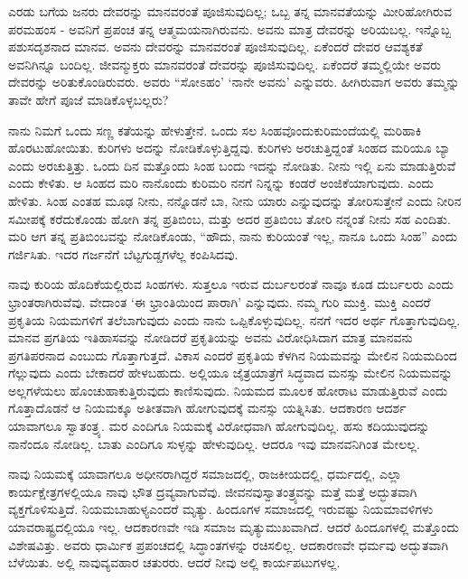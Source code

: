 ಎರಡು ಬಗೆಯ ಜನರು ದೇವರನ್ನು ಮಾನವರಂತೆ ಪೂಜಿಸುವುದಿಲ್ಲ; ಒಬ್ಬ ತನ್ನ ಮಾನವತೆಯನ್ನು ಮೀರಿಹೋಗಿರುವ ಪರಮಹಂಸ - ಅವನಿಗೆ ಪ್ರಪಂಚ ತನ್ನ ಆತ್ಮಮಯನಾಗಿರುವನು. ಅವನು ಮಾತ್ರ ದೇವರನ್ನು ಅರಿಯಬಲ್ಲ. ಇನ್ನೊಬ್ಬ ಪಶುಸದೃಶನಾದ ಮಾನವ. ಅವನು ದೇವರನ್ನು ಮಾನವರಂತೆ ಪೂಜಿಸುವುದಿಲ್ಲ. ಏಕೆಂದರೆ ದೇವರ ಆವಶ್ಯಕತೆ ಅವನಿಗಿನ್ನೂ ಬಂದಿಲ್ಲ. ಜೀವನ್ಮುಕ್ತರು ಮಾನವರಂತೆ ದೇವರನ್ನು ಪೂಜಿಸುವುದಿಲ್ಲ. ಏಕೆಂದರೆ ತಮ್ಮಲ್ಲಿಯೇ ಅವರು ದೇವರನ್ನು ಅರಿತುಕೊಂಡಿರುವರು. ಅವರು “ಸೋಽಹಂ’ ‘ನಾನೇ ಅವನು’ ಎನ್ನುವರು. ಹೀಗಿರುವಾಗ ಅವರು ತಮ್ಮನ್ನು ತಾವೇ ಹೇಗೆ ಪೂಜೆ ಮಾಡಿಕೊಳ್ಳಬಲ್ಲರು?

ನಾನು ನಿಮಗೆ ಒಂದು ಸಣ್ಣ ಕತೆಯನ್ನು ಹೇಳುತ್ತೇನೆ. ಒಂದು ಸಲ ಸಿಂಹವೊಂದು\break ಕುರಿಮಂದೆಯಲ್ಲಿ ಮರಿಹಾಕಿ ಹೊರಟುಹೋಯಿತು. ಕುರಿಗಳು ಅದನ್ನು ನೋಡಿಕೊಳ್ಳುತ್ತಿದ್ದವು. ಕುರಿಗಳು ಅರಚುತ್ತಿದ್ದಂತೆ ಸಿಂಹದ ಮರಿಯೂ ಬ್ಯಾ ಎಂದು ಅರಚುತ್ತಿತ್ತು. ಒಂದು ದಿನ ಮತ್ತೊಂದು ಸಿಂಹ ಬಂದು ಇದನ್ನು ನೋಡಿತು. ನೀನು ಇಲ್ಲಿ ಏನು ಮಾಡುತ್ತಿರುವೆ ಎಂದು ಕೇಳಿತು. ಆ ಸಿಂಹದ ಮರಿ ನಾನೊಂದು ಕುರಿಮರಿ ನನಗೆ ನಿನ್ನನ್ನು ಕಂಡರೆ ಅಂಜಿಕೆಯಾಗುವುದು. ಎಂದು ಹೇಳಿತು. ಸಿಂಹ ಎಂತಹ ಮೂಢ ನೀನು, ನನ್ನೊಡನೆ ಬಾ, ನೀನು ಯಾರು ಎನ್ನುವುದನ್ನು ತೋರಿಸುತ್ತೇನೆ ಎಂದು ನೀರಿನ ಸಮೀಪಕ್ಕೆ ಕರೆದುಕೊಂಡು ಹೋಗಿ ತನ್ನ ಪ್ರತಿಬಿಂಬ, ಮತ್ತು ಅದರ ಪ್ರತಿಬಿಂಬ ತೋರಿ ನನ್ನಂತೆ ನೀನು ಸಹ ಎಂದಿತು. ಮರಿ ಆಗ ತನ್ನ ಪ್ರತಿಬಿಂಬವನ್ನು ನೋಡಿಕೊಂಡು, “ಹೌದು, ನಾನು ಕುರಿಯಂತೆ ಇಲ್ಲ, ನಾನೂ ಒಂದು ಸಿಂಹ” ಎಂದು ಗರ್ಜಿಸಿತು. ಇದರ ಗರ್ಜನೆಗೆ ಬೆಟ್ಟಗುಡ್ಡಗಳೆಲ್ಲ ಕಂಪಿಸಿದವು.

ನಾವು ಕುರಿಯ ಹೊದಿಕೆಯಲ್ಲಿರುವ ಸಿಂಹಗಳು. ಸುತ್ತಲೂ ಇರುವ ದುರ್ಬಲರಂತೆ ನಾವೂ ಕೂಡ ದುರ್ಬಲರು ಎಂದು ಭ್ರಾಂತರಾಗಿರುವೆವು. ವೇದಾಂತ ‘ಈ ಭ್ರಾಂತಿಯಿಂದ ಪಾರಾಗಿ’ ಎನ್ನುವುದು. ನಮ್ಮ ಗುರಿ ಮುಕ್ತಿ. ಮುಕ್ತಿ ಎಂದರೆ ಪ್ರಕೃತಿಯ ನಿಯಮಗಳಿಗೆ ತಲೆಬಾಗುವುದು ಎಂದು ನಾನು ಒಪ್ಪಿಕೊಳ್ಳುವುದಿಲ್ಲ. ನನಗೆ ಇದರ ಅರ್ಥ ಗೊತ್ತಾಗುವುದಿಲ್ಲ. ಮಾನವ ಪ್ರಗತಿಯ ಇತಿಹಾಸವನ್ನು ನೋಡಿದರೆ ಪ್ರಕೃತಿಯನ್ನು ಅವನು ವಿರೋಧಿಸಿದಾಗ ಮಾತ್ರ ಮಾನವನು ಪ್ರಗತಿಪರನಾದ ಎಂಬುದು ಗೊತ್ತಾಗುತ್ತದೆ. ವಿಕಾಸ ಎಂದರೆ ಪ್ರಕೃತಿಯ ಕೆಳಗಿನ ನಿಯಮವನ್ನು ಮೇಲಿನ ನಿಯಮದಿಂದ ಗೆಲ್ಲುವುದು ಎಂದು ಬೇಕಾದರೆ ಹೇಳಬಹುದು. ಅಲ್ಲಿಯೂ ಜೈತ್ರಯಾತ್ರೆಗೆ ಸಿದ್ಧವಾದ ಮನಸ್ಸು ಮೇಲಿನ ನಿಯಮವನ್ನು ಅಲ್ಲಗಳೆಯಲು ಹೊಂಚುಹಾಕುತ್ತಿರುವುದು ಕಾಣಿಸುವುದು. ನಿಯಮದ ಮೂಲಕ ಹೋರಾಟ ಮಾಡುತ್ತಿರುವೆ ಎಂದು ಗೊತ್ತಾದೊಡನೆ ಆ ನಿಯಮಕ್ಕೂ ಅತೀತವಾಗಿ ಹೋಗುವುದಕ್ಕೆ ಮನಸ್ಸು ಯತ್ನಿಸಿತು. ಆದಕಾರಣ ಆದರ್ಶ ಯಾವಾಗಲೂ ಸ್ವಾತಂತ್ರ್ಯ. ಮರ ಎಂದಿಗೂ ನಿಯಮಕ್ಕೆ ವಿರೋಧವಾಗಿ ಹೋಗುವುದಿಲ್ಲ. ಹಸು ಕದಿಯುವುದನ್ನು ನಾನೆಂದೂ ನೋಡಿಲ್ಲ. ಬಾತು ಎಂದಿಗೂ ಸುಳ್ಳನ್ನು ಹೇಳುವುದಿಲ್ಲ. ಆದರೂ ಇವು ಮಾನವನಿಗಿಂತ ಮೇಲಲ್ಲ.

ನಾವು ನಿಯಮಕ್ಕೆ ಯಾವಾಗಲೂ ಅಧೀನರಾಗಿದ್ದರೆ ಸಮಾಜದಲ್ಲಿ, ರಾಜಕೀಯದಲ್ಲಿ, ಧರ್ಮದಲ್ಲಿ, ಎಲ್ಲಾ ಕಾರ್ಯಕ್ಷೇತ್ರಗಳಲ್ಲಿಯೂ ನಾವು ಭೌತ ದ್ರವ್ಯವಾಗುವೆವು. ಜೀವನವು\break ಸ್ವಾತಂತ್ರ್ಯವನ್ನು ಮತ್ತೆ ಮತ್ತೆ ಅದ್ಭುತವಾಗಿ ವ್ಯಕ್ತಗೊಳಿಸುತ್ತಿದೆ. ನಿಯಮಬಾಹುಳ್ಯ\break ಎಂದರೆ ಮೃತ್ಯು. ಹಿಂದೂಗಳ ಸಮಾಜದಲ್ಲಿ ಇರುವಷ್ಟು ನಿಯಮಾವಳಿಗಳು ಯಾವ\break ರಾಷ್ಟ್ರದಲ್ಲಿಯೂ ಇಲ್ಲ. ಆದಕಾರಣವೇ ಇಡಿ ಸಮಾಜ ಮೃತ್ಯುಮುಖವಾಗಿದೆ. ಆದರೆ ಹಿಂದೂಗಳಲ್ಲಿ ಮತ್ತೊಂದು ವಿಶೇಷವಿತ್ತು. ಅವರು ಧಾರ್ಮಿಕ ಪ್ರಪಂಚದಲ್ಲಿ ಸಿದ್ಧಾಂತಗಳನ್ನು ರಚಿಸಲಿಲ್ಲ. ಆದಕಾರಣವೇ ಧರ್ಮವು ಅದ್ಭುತವಾಗಿ ಬೆಳೆಯಿತು. ಅಲ್ಲಿ ನಾವು\break ವ್ಯವಹಾರ ಚತುರರು. ಆದರೆ ನೀವು ಅಲ್ಲಿ ಕಾರ್ಯಪಟುಗಳಲ್ಲ.


